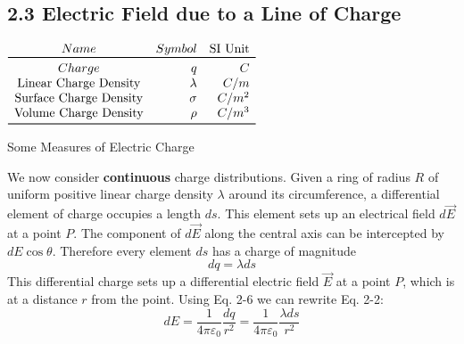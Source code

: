 \documentclass[12pt, a4paper]{article}
\begin{document}
		
		\subsection*{2.3 Electric Field due to a Line of Charge}
		
		\begin{table} 
			
			$ \begin{array}{crrr}
				 Name & Symbol & \text{SI Unit} \\
				\toprule
				Charge & q & C \\
				\text{Linear Charge Density} & \lambda & C/m \\
				\text{Surface Charge Density} & \sigma & C/m^2 \\
				\text{Volume Charge Density} & \rho & C/m^3 \\
				\bottomrule
			\end{array} $
			\caption{Some Measures of Electric Charge}
		\end{table}
		
		We now consider \textbf{continuous} charge distributions. Given a ring of radius $R$ of uniform positive linear charge density $\lambda$ around its circumference, a differential element of charge occupies a length $ds$. This element sets up an electrical field $d\vec{E}$ at a point $P$. The component of $d\vec{E}$ along the central axis can be intercepted by $dE\cos\theta$.
		Therefore every element $ds$ has a charge of magnitude 
		\begin{equation*}
			dq = \lambda ds \tag{2-6}
		\end{equation*}
		This differential charge sets up a differential electric field $\vec{E}$ at a point $P$, which is at a distance $r$ from the point. Using Eq. 2-6 we can rewrite Eq. 2-2:
		\begin{equation*}
			dE = \frac{1}{4\pi\varepsilon_0} \frac{dq}{r^2} 
			   = \frac{1}{4\pi\varepsilon_0} \frac{\lambda ds}{r^2}
			   \tag{22-7}
		\end{equation*}
		
\end{document}
